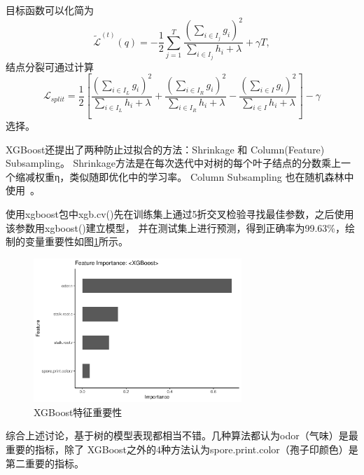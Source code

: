 \documentclass[lang=cn,11pt,a4paper,cite=super]{elegantpaper}
\begin{document}
\begin{enumerate}
      目标函数可以化简为
      $$\tilde{\mathcal{L}}^{(t)}(q)=-\frac{1}{2} \sum_{j=1}^{T} \frac{\left(
         \sum_{i \in I_{j}} g_{i}\right)^{2}}{\sum_{i \in I_{j}} h_{i}+\lambda}+\gamma T,$$
      结点分裂可通过计算
      $$\mathcal{L}_{s p l i t}=\frac{1}{2}\left[\frac{\left(\sum_{i \in I_{L}} 
      g_{i}\right)^{2}}{\sum_{i \in I_{L}} h_{i}+\lambda}+\frac{\left(\sum_{i \in I_{R}}
       g_{i}\right)^{2}}{\sum_{i \in I_{R}} h_{i}+\lambda}-
      \frac{\left(\sum_{i \in I} g_{i}\right)^{2}}{\sum_{i \in I} h_{i}+\lambda}\right]-\gamma$$
      选择。
     \par  XGBoost还提出了两种防止过拟合的方法：Shrinkage 和 Column(Feature) Subsampling。
      Shrinkage方法是在每次迭代中对树的每个叶子结点的分数乘上一个缩减权重η，类似随即优化中的学习率。
      Column Subsampling 也在随机森林中使用~\cite{xgb}。
   \par 使用xgboost包中xgb.cv()先在训练集上通过5折交叉检验寻找最佳参数，之后使用该参数用xgboost()建立模型，
   并在测试集上进行预测，得到正确率为99.63\%，绘制的变量重要性如图\ref{fig:xgb}所示。
   \begin{figure}[hbt]
      \centering
      \includegraphics[width=0.7\textwidth]{img/xgb-1.pdf}
      \caption{XGBoost特征重要性}
      \label{fig:xgb}
   \end{figure}
\end{enumerate}
\par 综合上述讨论，基于树的模型表现都相当不错。几种算法都认为odor（气味）是最重要的指标，除了
XGBoost之外的4种方法认为spore.print.color（孢子印颜色）是第二重要的指标。
\end{document}
